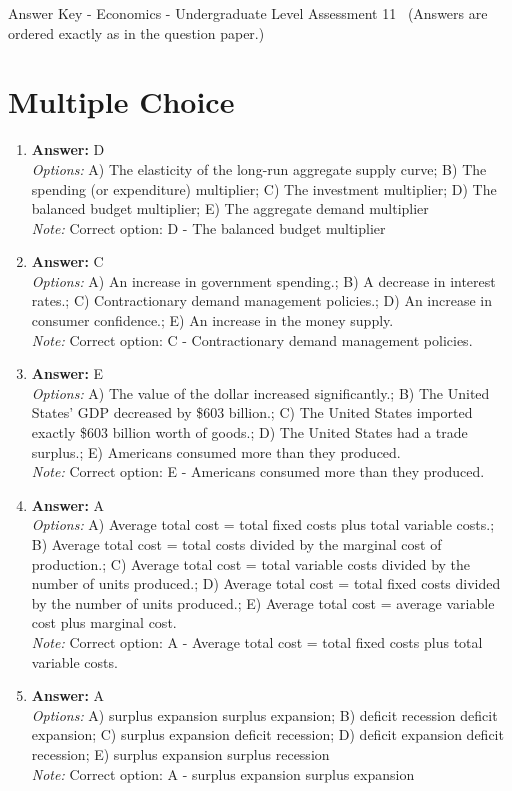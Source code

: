 \documentclass[12pt]{article}
\begin{document}
\begin{center}
Answer Key - Economics - Undergraduate Level Assessment 11 \
\small (Answers are ordered exactly as in the question paper.)
\end{center}

\section*{Multiple Choice}
\begin{enumerate}[label=\arabic*.]
\item \textbf{Answer:} D
\\ \textit{Options:} A) The elasticity of the long-run aggregate supply curve; B) The spending (or expenditure) multiplier; C) The investment multiplier; D) The balanced budget multiplier; E) The aggregate demand multiplier
\\ \textit{Note:} Correct option: D - The balanced budget multiplier
\item \textbf{Answer:} C
\\ \textit{Options:} A) An increase in government spending.; B) A decrease in interest rates.; C) Contractionary demand management policies.; D) An increase in consumer confidence.; E) An increase in the money supply.
\\ \textit{Note:} Correct option: C - Contractionary demand management policies.
\item \textbf{Answer:} E
\\ \textit{Options:} A) The value of the dollar increased significantly.; B) The United States' GDP decreased by \$603 billion.; C) The United States imported exactly \$603 billion worth of goods.; D) The United States had a trade surplus.; E) Americans consumed more than they produced.
\\ \textit{Note:} Correct option: E - Americans consumed more than they produced.
\item \textbf{Answer:} A
\\ \textit{Options:} A) Average total cost = total fixed costs plus total variable costs.; B) Average total cost = total costs divided by the marginal cost of production.; C) Average total cost = total variable costs divided by the number of units produced.; D) Average total cost = total fixed costs divided by the number of units produced.; E) Average total cost = average variable cost plus marginal cost.
\\ \textit{Note:} Correct option: A - Average total cost = total fixed costs plus total variable costs.
\item \textbf{Answer:} A
\\ \textit{Options:} A) surplus expansion surplus expansion; B) deficit recession deficit expansion; C) surplus expansion deficit recession; D) deficit expansion deficit recession; E) surplus expansion surplus recession
\\ \textit{Note:} Correct option: A - surplus expansion surplus expansion
\end{enumerate}
\end{document}
